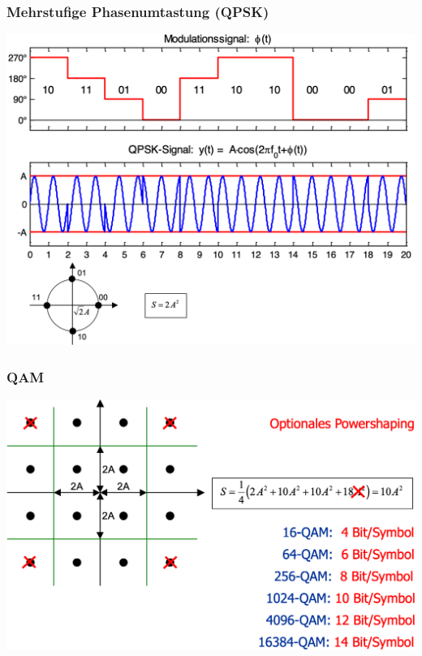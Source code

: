 \subsubsection{Mehrstufige Phasenumtastung (QPSK)}
\begin{center}
    \includegraphics[width=\linewidth]{graphic/fourier/Mehrstufige Phasenumtastung.png}
\end{center}
\vspace{-8pt}


\subsubsection{QAM}
\begin{center}
    \includegraphics[width=\linewidth]{graphic/fourier/QAM.png}
\end{center}
\vspace{-8pt}
